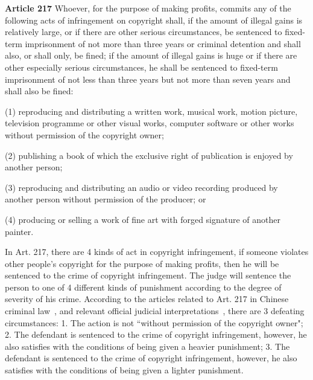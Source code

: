 \documentclass{IOS-Book-Article}
\begin{document}
\footnotesize
\begin{adjustwidth}{0.5cm}{0cm}
\noindent \textbf{Article 217} Whoever, for the purpose of making profits, commits any of the following acts of infringement on copyright shall, if the amount of illegal gains is relatively large, or if there are other serious circumstances, be sentenced to fixed-term imprisonment of not more than three years or criminal detention and shall also, or shall only, be fined; if the amount of illegal gains is huge or if there are other especially serious circumstances, he shall be sentenced to fixed-term imprisonment of not less than three years but not more than seven years and shall also be fined:

\noindent (1) reproducing and distributing a written work, musical work, motion picture, television programme or other visual works, computer software or other works without permission of the copyright owner;

\noindent (2) publishing a book of which the exclusive right of publication is enjoyed by another person;

\noindent (3) reproducing and distributing an audio or video recording produced by another person without permission of the producer; or

\noindent (4) producing or selling a work of fine art with forged signature of another painter.\newline
\end{adjustwidth}

\normalsize
\noindent 
In Art. 217, there are 4 kinds of act in copyright infringement, if someone violates other people's copyright for the purpose of making profits, then he will be sentenced to the crime of copyright infringement. The judge will sentence the person to one of 4 different kinds of punishment according to the degree of severity of his crime. According to the articles related to Art. 217 in Chinese criminal law~\cite{StateCouncil2015series}, and relevant official judicial interpretations~\cite{SupremeCourt2011Judicial}, there are 3 defeating circumstances: 1. The action is not ``without permission of the copyright owner"; 2. The defendant is sentenced to the crime of copyright infringement, however, he also satisfies with the conditions of being given a heavier punishment; 3. The defendant is sentenced to the crime of copyright infringement, however, he also satisfies with the conditions of being given a lighter punishment.
\end{document}
